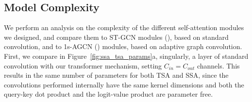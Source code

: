 \documentclass[times,twocolumn,final,authoryear]{elsarticle}
\begin{document}
\subsection{Model Complexity}\label{sec:complexity}
We perform an analysis on the complexity of the different self-attention modules we designed, and compare them to ST-GCN modules (\cite{yan2018spatial}), based on standard convolution, and to 1s-AGCN (\cite{Shi2018TwoStreamAG}) modules, based on adaptive graph convolution. 
First, we compare in Figure~\ref{fig:ssa_tsa_params}a, singularly, a layer of standard convolution with our transformer mechanism, setting $C_{in}=C_{out}$ channels. This results in the same number of parameters for both TSA and SSA, since the convolutions performed internally have the same kernel dimensions and both the query-key dot product and the logit-value product are parameter free.
\end{document}

